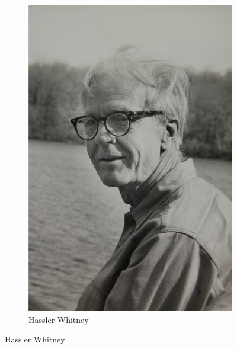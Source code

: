 \begin{figure}
\begin{subfigure}{0.5\textwidth}
    \includegraphics[scale=0.4]{img/imgintro/whitney.jpg}
    \caption{Hassler Whitney}
\end{subfigure}
\end{figure}


